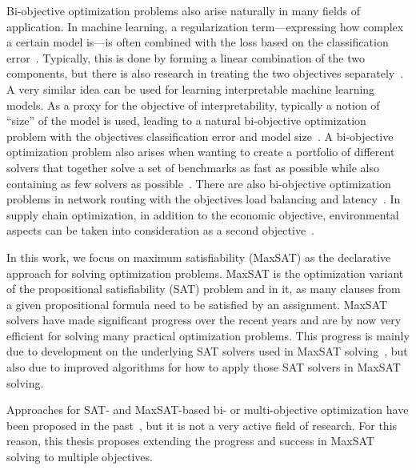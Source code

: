 Bi-objective optimization problems also arise naturally in many fields of application.
In machine learning, a regularization term---expressing how complex a certain model is---is often combined with the loss based on the classification error~\autocite{}.
Typically, this is done by forming a linear combination of the two components, but there is also research in treating the two objectives separately~\autocite{DBLP:journals/tsmc/JinS08}.
A very similar idea can be used for learning interpretable machine learning models.
As a proxy for the objective of interpretability, typically a notion of ``size'' of the model is used, leading to a natural bi-objective optimization problem with the objectives classification error and model size~\autocites{DBLP:conf/ijcai/Ignatiev0NS21,DBLP:conf/cp/MaliotovM18,DBLP:conf/ijcai/NarodytskaIPM18,DBLP:conf/ijcai/Hu0HH20,DBLP:conf/cp/YuISB20,DBLP:conf/aaai/Ignatiev0S021}.
A bi-objective optimization problem also arises when wanting to create a portfolio of different solvers that together solve a set of benchmarks as fast as possible while also containing as few solvers as possible~\autocite{DBLP:conf/cp/JanotaMSM21}.
There are also bi-objective optimization problems in network routing with the objectives load balancing and latency~\autocite{SilverioEtAl2022biobjectiveoptimization}.
In supply chain optimization, in addition to the economic objective, environmental aspects can be taken into consideration as a second objective~\autocite{DBLP:journals/cce/Pinto-VarelaBN11}.

In this work, we focus on maximum satisfiability (MaxSAT) as the declarative approach for solving optimization problems.
MaxSAT is the optimization variant of the propositional satisfiability (SAT) problem and in it, as many clauses from a given propositional formula need to be satisfied by an assignment.
MaxSAT solvers have made significant progress over the recent years and are by now very efficient for solving many practical optimization problems.
This progress is mainly due to development on the underlying SAT solvers used in MaxSAT solving~\autocite{}, but also due to improved algorithms for how to apply those SAT solvers in MaxSAT solving.

Approaches for SAT- and MaxSAT-based bi- or multi-objective optimization have been proposed in the past~\autocites{DBLP:conf/cp/SohBTB17,DBLP:conf/ijcai/Terra-NevesLM18a,DBLP:conf/aaai/Terra-NevesLM18,DBLP:conf/ijcai/Terra-NevesLM18,DBLP:conf/cp/JanotaMSM21}, but it is not a very active field of research.
For this reason, this thesis proposes extending the progress and success in MaxSAT solving to multiple objectives.

